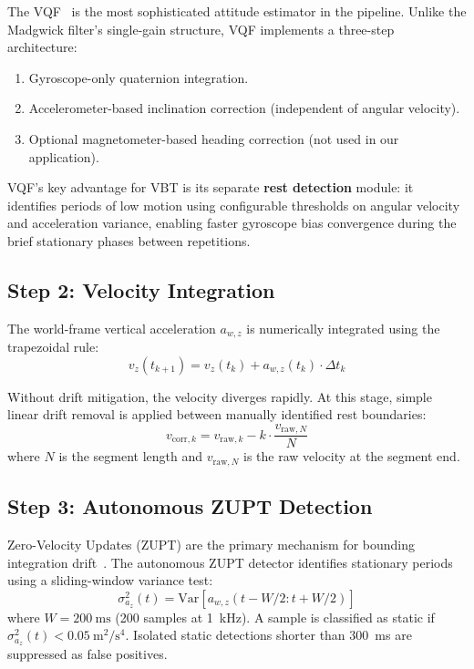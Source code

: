 The VQF~\cite{laidig2023} is the most sophisticated attitude estimator in the pipeline.
Unlike the Madgwick filter's single-gain structure, VQF implements a three-step architecture:
\begin{enumerate}[nosep]
  \item Gyroscope-only quaternion integration.
  \item Accelerometer-based inclination correction (independent of angular velocity).
  \item Optional magnetometer-based heading correction (not used in our application).
\end{enumerate}

VQF's key advantage for VBT is its separate \textbf{rest detection} module: it identifies periods of low motion using configurable thresholds on angular velocity and acceleration variance, enabling faster gyroscope bias convergence during the brief stationary phases between repetitions.


\subsection{Step 2: Velocity Integration}

The world-frame vertical acceleration $a_{w,z}$ is numerically integrated using the trapezoidal rule:
\begin{equation}
  v_z(t_{k+1}) = v_z(t_k) + a_{w,z}(t_k) \cdot \Delta t_k
\end{equation}

Without drift mitigation, the velocity diverges rapidly.
At this stage, simple linear drift removal is applied between manually identified rest boundaries:
\begin{equation}
  v_{\text{corr},k} = v_{\text{raw},k} - k \cdot \frac{v_{\text{raw},N}}{N}
\end{equation}
where $N$ is the segment length and $v_{\text{raw},N}$ is the raw velocity at the segment end.


\subsection{Step 3: Autonomous ZUPT Detection}

Zero-Velocity Updates (ZUPT) are the primary mechanism for bounding integration drift~\cite{skog2010}.
The autonomous ZUPT detector identifies stationary periods using a sliding-window variance test:
\begin{equation}
  \sigma^2_{a_z}(t) = \text{Var}\!\left[a_{w,z}(t-W/2 : t+W/2)\right]
\end{equation}
where $W = \SI{200}{\milli\second}$ (\SI{200}{} samples at \SI{1}{\kilo\hertz}).
A sample is classified as static if $\sigma^2_{a_z}(t) < \SI{0.05}{\metre\squared\per\second^4}$.
Isolated static detections shorter than \SI{300}{\milli\second} are suppressed as false positives.


